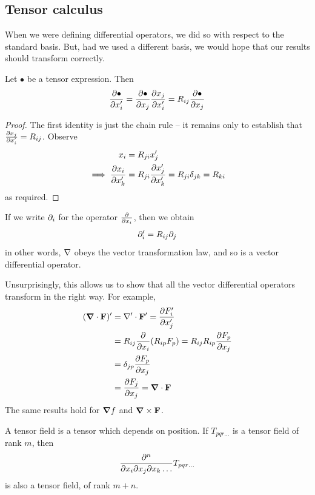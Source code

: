 \documentclass{../../template/note}
\begin{document}
    \subsection{Tensor calculus}

    When we were defining differential operators, we did so with respect to the standard basis. But, had we used a different basis, we would hope that our results should transform correctly.

    \begin{proposition}
        Let \(\bullet\) be a tensor expression. Then
        \begin{align*}
            \pd{\bullet}{x_i'} = \pd{\bullet}{x_j} \pd{x_j}{x_i'} = R_{ij} \pd{\bullet}{x_j}
        \end{align*}
    \end{proposition}
    
    \begin{proof}
        The first identity is just the chain rule -- it remains only to establish that \(\pd{x_j}{x_i'} = R_{ij}\). Observe
        \begin{align*}
            x_i &= R_{ji} x_j' \\
            \implies \pd{x_i}{x_k'} &= R_{ji} \pd{x_j'}{x_k'} = R_{ji} \delta_{jk} = R_{ki}
        \end{align*}
        as required.        
    \end{proof}
    
    If we write \(\partial_i\) for the operator \(\pd{}{x_i}\), then we obtain
    \begin{align*}
        \partial_i' = R_{ij} \partial_j
    \end{align*}
    in other words, \(\nabla\) obeys the vector transformation law, and so is a vector differential operator.

    Unsurprisingly, this allows us to show that all the vector differential operators transform in the right way. For example,
    \begin{align*}
        (\div \V F)' &= \del' \cdot \V F ' = \pd{F_i'}{x_j'} \\
        &= R_{ij} \pd{}{x_i}(R_{ip}F_p) = R_{ij}R_{ip} \pd{F_p}{x_j} \\
        &= \delta_{jp} \pd{F_p}{x_j} \\
        &= \pd{F_j}{x_j} = \div \V F
    \end{align*}
    The same results hold for \(\grad f\) and \(\curl \V F\).

    A tensor field is a tensor which depends on position. If \(T_{pqr\dots}\) is a tensor field of rank \(m\), then
    \begin{align*}
        \pd{^n}{x_i \pr x_j \pr x_k \dots} T_{pqr\dots}
    \end{align*}
    is also a tensor field, of rank \(m+n\).
\end{document}
